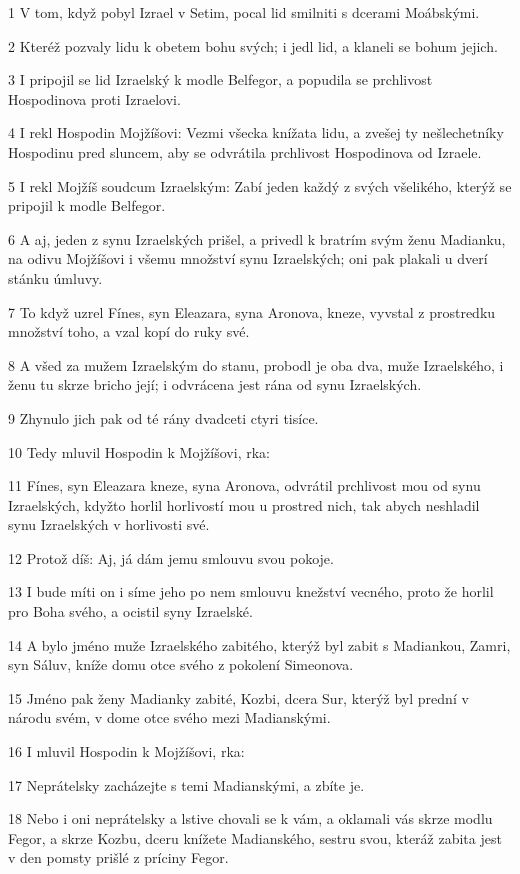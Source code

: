\par 1 V tom, když pobyl Izrael v Setim, pocal lid smilniti s dcerami Moábskými.
\par 2 Kteréž pozvaly lidu k obetem bohu svých; i jedl lid, a klaneli se bohum jejich.
\par 3 I pripojil se lid Izraelský k modle Belfegor, a popudila se prchlivost Hospodinova proti Izraelovi.
\par 4 I rekl Hospodin Mojžíšovi: Vezmi všecka knížata lidu, a zvešej ty nešlechetníky Hospodinu pred sluncem, aby se odvrátila prchlivost Hospodinova od Izraele.
\par 5 I rekl Mojžíš soudcum Izraelským: Zabí jeden každý z svých všelikého, kterýž se pripojil k modle Belfegor.
\par 6 A aj, jeden z synu Izraelských prišel, a privedl k bratrím svým ženu Madianku, na odivu Mojžíšovi i všemu množství synu Izraelských; oni pak plakali u dverí stánku úmluvy.
\par 7 To když uzrel Fínes, syn Eleazara, syna Aronova, kneze, vyvstal z prostredku množství toho, a vzal kopí do ruky své.
\par 8 A všed za mužem Izraelským do stanu, probodl je oba dva, muže Izraelského, i ženu tu skrze bricho její; i odvrácena jest rána od synu Izraelských.
\par 9 Zhynulo jich pak od té rány dvadceti ctyri tisíce.
\par 10 Tedy mluvil Hospodin k Mojžíšovi, rka:
\par 11 Fínes, syn Eleazara kneze, syna Aronova, odvrátil prchlivost mou od synu Izraelských, kdyžto horlil horlivostí mou u prostred nich, tak abych neshladil synu Izraelských v horlivosti své.
\par 12 Protož díš: Aj, já dám jemu smlouvu svou pokoje.
\par 13 I bude míti on i síme jeho po nem smlouvu knežství vecného, proto že horlil pro Boha svého, a ocistil syny Izraelské.
\par 14 A bylo jméno muže Izraelského zabitého, kterýž byl zabit s Madiankou, Zamri, syn Sáluv, kníže domu otce svého z pokolení Simeonova.
\par 15 Jméno pak ženy Madianky zabité, Kozbi, dcera Sur, kterýž byl prední v národu svém, v dome otce svého mezi Madianskými.
\par 16 I mluvil Hospodin k Mojžíšovi, rka:
\par 17 Neprátelsky zacházejte s temi Madianskými, a zbíte je.
\par 18 Nebo i oni neprátelsky a lstive chovali se k vám, a oklamali vás skrze modlu Fegor, a skrze Kozbu, dceru knížete Madianského, sestru svou, kteráž zabita jest v den pomsty prišlé z príciny Fegor.


